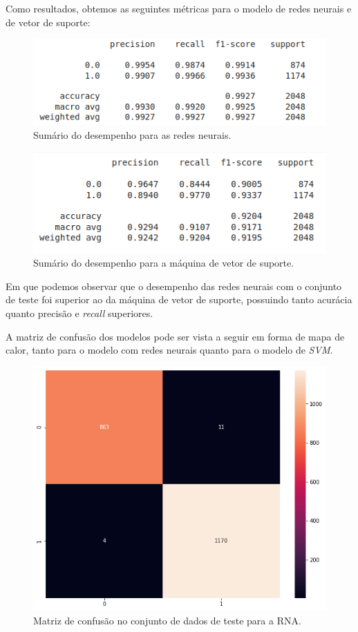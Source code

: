 \documentclass[a4paper, 12pt]{article}
\begin{document}
Como resultados, obtemos as seguintes métricas para o modelo de redes neurais e de vetor de suporte:


\begin{figure}[h]
	\centering
	\includegraphics[width=0.5\linewidth]{figuras/quest10_summaryRNA.png}
    \caption{Sumário do desempenho para as redes neurais.}
    \label{fig:quest10_summaryRNA}
\end{figure}
\FloatBarrier

\begin{figure}[h]
	\centering
	\includegraphics[width=0.5\linewidth]{figuras/quest10_summarySVM.png}
    \caption{Sumário do desempenho para a máquina de vetor de suporte.}
    \label{fig:quest10_summarySVM}
\end{figure}
\FloatBarrier

Em que podemos observar que o desempenho das redes neurais com o conjunto de teste foi superior ao da máquina de vetor de suporte, possuindo tanto acurácia quanto precisão e \textit{recall} superiores.

A matriz de confusão dos modelos pode ser vista a seguir em forma de mapa de calor, tanto para o modelo com redes neurais quanto para o modelo de \textit{SVM}.


\begin{figure}[h]
	\centering
	\includegraphics[width=0.5\linewidth]{figuras/quest10_confusaoRNA.png}
    \caption{Matriz de confusão no conjunto de dados de teste para a RNA.}
    \label{fig:quest10_confusaoRNA}
\end{figure}
\FloatBarrier
\end{document}
